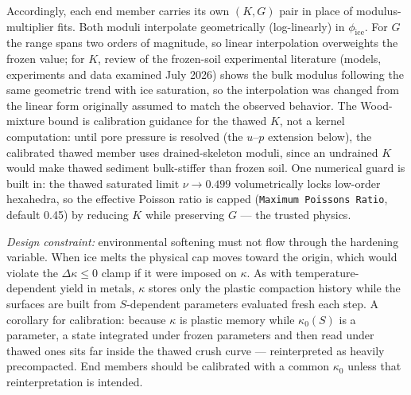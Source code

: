 \documentclass[12pt]{article}
\begin{document}
Accordingly, each end member carries its own $(K, G)$ pair in place
of modulus-multiplier fits. Both moduli interpolate geometrically
(log-linearly) in $\phi_{\mathrm{ice}}$. For $G$ the range spans two
orders of magnitude, so linear interpolation overweights the frozen
value; for $K$, review of the frozen-soil experimental literature
(models, experiments and data examined July 2026) shows the bulk
modulus following the same geometric trend with ice saturation, so
the interpolation was changed from the linear form originally
assumed to match the observed behavior. The Wood-mixture bound is
calibration guidance for the thawed $K$, not a kernel computation: until pore pressure is
resolved (the $u$--$p$ extension below), the calibrated thawed
member uses drained-skeleton moduli, since an undrained $K$ would
make thawed sediment bulk-stiffer than frozen soil. One numerical guard
is built in: the thawed saturated limit $\nu \to 0.499$
volumetrically locks low-order hexahedra, so the effective Poisson
ratio is capped (\texttt{Maximum Poissons Ratio}, default 0.45) by
reducing $K$ while preserving $G$ --- the trusted physics.

\emph{Design constraint:} environmental softening must not flow
through the hardening variable. When ice melts the physical cap
moves toward the origin, which would violate the
$\Delta\kappa \le 0$ clamp if it were imposed on $\kappa$. As with
temperature-dependent yield in metals, $\kappa$ stores only the
plastic compaction history while the surfaces are built from
$S$-dependent parameters evaluated fresh each step. A corollary for
calibration: because $\kappa$ is plastic memory while $\kappa_0(S)$
is a parameter, a state integrated under frozen parameters and then
read under thawed ones sits far inside the thawed crush curve ---
reinterpreted as heavily precompacted. End members should be
calibrated with a common $\kappa_0$ unless that reinterpretation is
intended.
\end{document}
